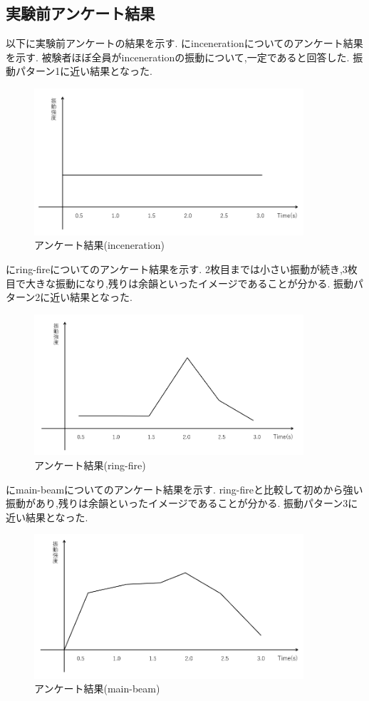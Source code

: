 \subsection{実験前アンケート結果}
以下に実験前アンケートの結果を示す.
にincenerationについてのアンケート結果を示す.
被験者ほぼ全員がincenerationの振動について,一定であると回答した.
振動パターン1に近い結果となった.
\begin{figure}[h]
\centering
\includegraphics[clip,width=10cm]{fig/incenerationAve.png}
\caption{アンケート結果(inceneration)}\label{inceA}
\end{figure}


にring-fireについてのアンケート結果を示す.
2枚目までは小さい振動が続き,3枚目で大きな振動になり,残りは余韻といったイメージであることが分かる.
振動パターン2に近い結果となった.
\begin{figure}[h]
\centering
\includegraphics[clip,width=10cm]{fig/ringfireAve.png}
\caption{アンケート結果(ring-fire)}\label{ringA}
\end{figure}



にmain-beamについてのアンケート結果を示す.
ring-fireと比較して初めから強い振動があり,残りは余韻といったイメージであることが分かる.
振動パターン3に近い結果となった.
\begin{figure}[h]
\centering
\includegraphics[clip,width=10cm]{fig/mainbeamAve.png}
\caption{アンケート結果(main-beam)}\label{mainA}
\end{figure}


